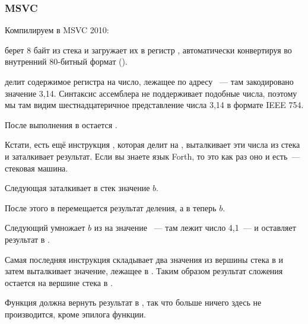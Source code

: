 \subsubsection{MSVC}

Компилируем в MSVC 2010:



\FLD берет 8 байт из стека и загружает их в регистр , автоматически конвертируя во внутренний 
80-битный формат ().

\FDIV делит содержимое регистра  на число, лежащее по адресу ~--- 
там закодировано значение 3,14. Синтаксис ассемблера не поддерживает подобные числа, 
поэтому мы там видим шестнадцатеричное представление числа 3,14 в формате IEEE 754.

После выполнения \FDIV в  остается .

Кстати, есть ещё инструкция \FDIVP, которая делит  на , 
выталкивает эти числа из стека и заталкивает результат. 
Если вы знаете язык Forth\FNURLFORTH, то это как раз оно и есть~--- стековая машина\FNURLSTACK.

Следующая \FLD заталкивает в стек значение $b$.

После этого в  перемещается результат деления, а в  теперь $b$.

Следующий \FMUL умножает $b$ из  на значение ~--- 
там лежит число 4,1~--- и оставляет результат в .

Самая последняя инструкция \FADDP складывает два значения из вершины стека 
в  и затем выталкивает значение, лежащее в . 
Таким образом результат сложения остается на вершине стека в .

Функция должна вернуть результат в , так что больше ничего здесь не производится, 
кроме эпилога функции.

\ifdefined\IncludeOlly

\fi
